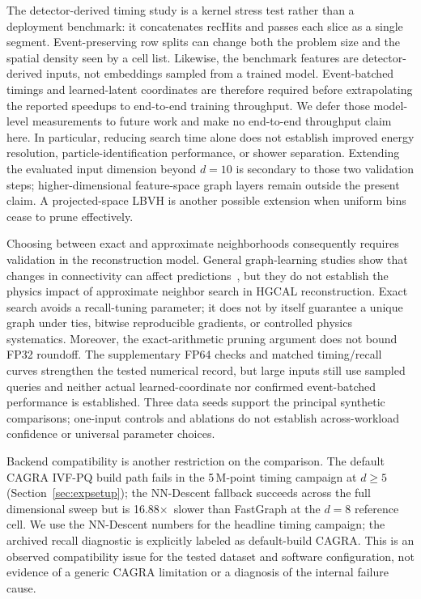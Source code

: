 \documentclass[final,3p,11pt]{elsarticle}
\newcommand{\spdHGCALcagradeight}{16.88\ensuremath{\times}}
\begin{document}
The detector-derived timing study is a kernel stress test rather than a
deployment benchmark: it concatenates recHits and passes each slice as a
single segment. Event-preserving row splits can change both the problem
size and the spatial density seen by a cell list. Likewise, the benchmark
features are detector-derived inputs, not embeddings sampled from a
trained model. Event-batched timings and learned-latent coordinates are
therefore required before extrapolating the reported speedups to
end-to-end training throughput. We defer those model-level measurements
to future work and make no end-to-end throughput claim here. In particular,
reducing search time alone does not establish improved energy resolution,
particle-identification performance, or shower separation. Extending
the evaluated input dimension
beyond $d{=}10$ is secondary to those two validation steps;
higher-dimensional feature-space graph layers remain outside the present
claim. A projected-space LBVH is another possible extension when uniform
bins cease to prune effectively.

Choosing between exact and approximate neighborhoods consequently
requires validation in the reconstruction model. General graph-learning studies
show that changes in connectivity can affect predictions~\cite{zugner2018adversarial,klicpera2019diffusion},
but they do not establish the physics impact of approximate neighbor
search in HGCAL reconstruction. Exact search avoids a recall-tuning
parameter; it does not by itself guarantee a unique graph under ties,
bitwise reproducible gradients, or controlled physics systematics.
Moreover, the exact-arithmetic pruning argument does not bound FP32
roundoff. The supplementary FP64 checks and matched timing/recall curves
strengthen the tested numerical record, but large inputs still use sampled
queries and neither actual learned-coordinate nor confirmed event-batched
performance is established. Three data seeds support the principal
synthetic comparisons; one-input controls and ablations do not establish
across-workload confidence or universal parameter choices.

Backend compatibility is another restriction on the comparison. The
default CAGRA IVF-PQ build path fails in the 5\,M-point timing campaign at $d \ge 5$
(Section~\ref{sec:expsetup}); the NN-Descent fallback succeeds
across the full dimensional sweep but is \spdHGCALcagradeight\
slower than FastGraph at the $d{=}8$ reference cell. We use the
NN-Descent numbers for the headline timing campaign; the archived recall
diagnostic is explicitly labeled as default-build CAGRA. This is an observed compatibility issue
for the tested dataset and software configuration, not evidence of a
generic CAGRA limitation or a diagnosis of the internal failure cause.
\end{document}
